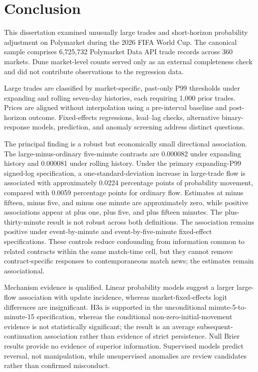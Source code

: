 \section{Conclusion}
\label{sec:conclusion}

This dissertation examined unusually large trades and short-horizon probability adjustment on Polymarket during the 2026 FIFA World Cup. The canonical sample comprises 6,725,732 Polymarket Data API trade records across 360 markets. Dune market-level counts served only as an external completeness check and did not contribute observations to the regression data.

Large trades are classified by market-specific, past-only P99 thresholds under expanding and rolling seven-day histories, each requiring 1,000 prior trades. Prices are aligned without interpolation using a pre-interval baseline and post-horizon outcome. Fixed-effects regressions, lead--lag checks, alternative binary-response models, prediction, and anomaly screening address distinct questions.

The principal finding is a robust but economically small directional association. The large-minus-ordinary five-minute contrasts are 0.000082 under expanding history and 0.000081 under rolling history. Under the primary expanding-P99 signed-log specification, a one-standard-deviation increase in large-trade flow is associated with approximately 0.0224 percentage points of probability movement, compared with 0.0059 percentage points for ordinary flow. Estimates at minus fifteen, minus five, and minus one minute are approximately zero, while positive associations appear at plus one, plus five, and plus fifteen minutes. The plus-thirty-minute result is not robust across both definitions. The association remains positive under event-by-minute and event-by-five-minute fixed-effect specifications. These controls reduce confounding from information common to related contracts within the same match-time cell, but they cannot remove contract-specific responses to contemporaneous match news; the estimates remain associational.

Mechanism evidence is qualified. Linear probability models suggest a larger large-flow association with update incidence, whereas market-fixed-effects logit differences are insignificant. H3a is supported in the unconditional minute-5-to-minute-15 specification, whereas the conditional non-zero-initial-movement evidence is not statistically significant; the result is an average subsequent-continuation association rather than evidence of strict persistence. Null Brier results provide no evidence of superior information. Supervised models predict reversal, not manipulation, while unsupervised anomalies are review candidates rather than confirmed misconduct.

